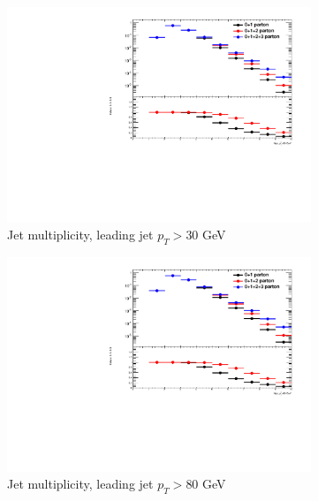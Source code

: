 \begin{figure} [thbp]
  \center
  \begin{subfigure}{0.48\linewidth}
    \includegraphics[width=\linewidth]{figures/monojet_appendix/h_njet30.pdf}
    \caption{Jet multiplicity, leading jet $p_{T}>30$ GeV}
  \end{subfigure}
  \begin{subfigure}{0.48\linewidth}
    \includegraphics[width=\linewidth]{figures/monojet_appendix/h_njet80.pdf}
    \caption{Jet multiplicity, leading jet $p_{T}>80$ GeV}
  \end{subfigure}
  \begin{subfigure}{0.48\linewidth}

\end{subfigure}
\end{figure}
